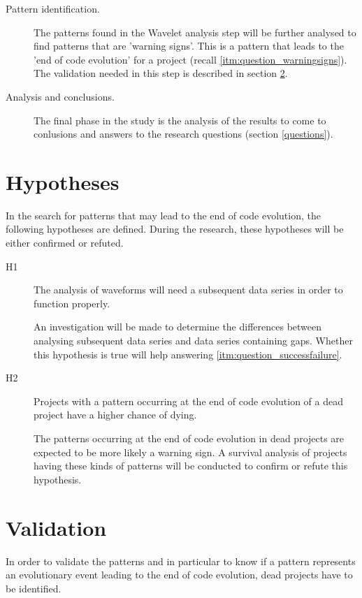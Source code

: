 \begin{description}
	\item[Pattern identification.] The patterns found in the Wavelet analysis step
	will be further analysed to find patterns that are 'warning signs'. This is a
	pattern that leads to the 'end of code evolution' for a project (recall
	\ref{itm:question_warningsigns}). The validation needed in this step is
	described in section \ref{method:validation}.
	
	\item[Analysis and conclusions.] The final phase in the study is the analysis
	of the results to come to conlusions and answers to the research questions
	(section \ref{questions}).
\end{description}

\section{Hypotheses}
In the search for patterns that may lead to the end of code evolution, the
following hypotheses are defined. During the research, these hypotheses will be
either confirmed or refuted.

\begin{description}
	\item[H1\label{hyp:subsequent_data}] \hspace{0em}
	The analysis of waveforms will need a subsequent data series in order
	to function properly.

	An investigation will be made to determine the differences between analysing
	subsequent data series and data series containing gaps. Whether this
	hypothesis is true will help answering \ref{itm:question_successfailure}.
	
	\item[H2\label{hyp:pattern_types}] \hspace{0em}
	Projects with a pattern occurring at the end of code evolution of a dead
	project have a higher chance of dying.

	The patterns occurring at the end of code evolution in dead projects are
	expected to be more likely a warning sign. A survival analysis of projects
	having these kinds of patterns will be conducted to confirm or refute this
	hypothesis.
\end{description}

\section{Validation}
\label{method:validation}
In order to validate the patterns and in particular to know if a pattern
represents an evolutionary event leading to the end of code evolution, dead
projects have to be identified.

